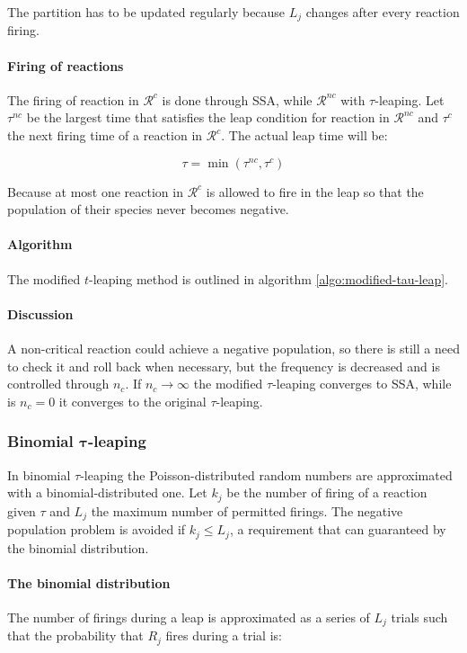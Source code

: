       The partition has to be updated regularly because $L_j$ changes after every reaction firing.

      \paragraph{Firing of reactions}
      The firing of reaction in $\mathcal{R}^{c}$ is done through SSA, while $\mathcal{R}^{nc}$ with $\tau$-leaping.
      Let $\tau^{nc}$ be the largest time that satisfies the leap condition for reaction in $\mathcal{R}^{nc}$ and $\tau^c$ the next firing time of a reaction in $\mathcal{R}^c$.
      The actual leap time will be:

      $$\tau = \min(\tau^{nc}, \tau^c)$$

      Because at most one reaction in $\mathcal{R}^c$ is allowed to fire in the leap so that the population of their species never becomes negative.

      \paragraph{Algorithm}
      The modified $t$-leaping method is outlined in algorithm \ref{algo:modified-tau-leap}.

      

      \paragraph{Discussion}
      A non-critical reaction could achieve a negative population, so there is still a need to check it and roll back when necessary, but the frequency is decreased and is controlled through $n_c$.
      If $n_c\rightarrow\infty$ the modified $\tau$-leaping converges to SSA, while is $n_c=0$ it converges to the original $\tau$-leaping.

    \subsubsection{Binomial $\mathbf{\tau}$-leaping}
    In binomial $\tau$-leaping the Poisson-distributed random numbers are approximated with a binomial-distributed one.
    Let $k_j$ be the number of firing of a reaction given $\tau$ and $L_j$ the maximum number of permitted firings.
    The negative population problem is avoided if $k_j\le L_j$, a requirement that can guaranteed by the binomial distribution.

      \paragraph{The binomial distribution}
      The number of firings during a leap is approximated as a series of $L_j$ trials such that the probability that $R_j$ fires during a trial is:

